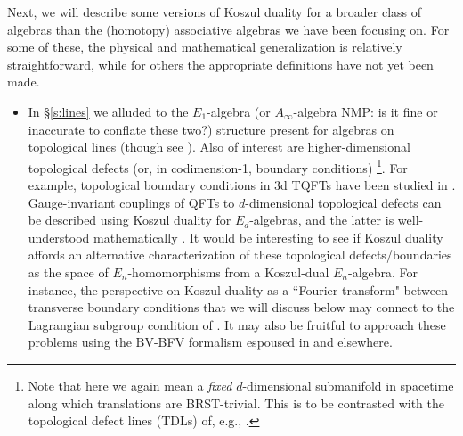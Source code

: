 \documentclass[11pt]{amsart}
\def\natalie#1{{\textcolor{green!65!black}{NMP: {#1}}}}
\begin{document}
Next, we will describe some versions of Koszul duality for a broader class of algebras than the (homotopy) associative algebras we have been focusing on. For some of these, the physical and mathematical generalization is relatively straightforward, while for others the appropriate definitions have not yet been made. 

\begin{itemize}

\item In \S \ref{s:lines} we alluded to the $E_1$-algebra (or $A_{\infty}$-algebra \natalie{is it fine or inaccurate to conflate these two?}) structure present for algebras on topological lines (though see \cite{GO}). Also of interest are higher-dimensional topological defects (or, in codimension-1, boundary conditions) \footnote{Note that here we again mean a \textit{fixed} $d$-dimensional submanifold in spacetime along which translations are BRST-trivial. This is to be contrasted with the topological defect lines (TDLs) of, e.g., \cite{Yinetal}.}. For example, topological boundary conditions in 3d TQFTs have been studied in \cite{KS, BM, Kaidietal}. Gauge-invariant couplings of QFTs to $d$-dimensional topological defects can be described using Koszul duality for $E_d$-algebras, and the latter is well-understood mathematically \cite{lurie2011formal}. It would be interesting to see if Koszul duality affords an alternative characterization of these topological defects/boundaries as the space of $E_n$-homomorphisms from a Koszul-dual $E_n$-algebra. For instance, the perspective on Koszul duality as a ``Fourier transform" between transverse boundary conditions that we will discuss below may connect to the Lagrangian subgroup condition of \cite{KS}. It may also be fruitful to approach these problems using the BV-BFV formalism espoused in \cite{Cattaneo:2020lle} and elsewhere. 


\end{itemize}
\end{document}

